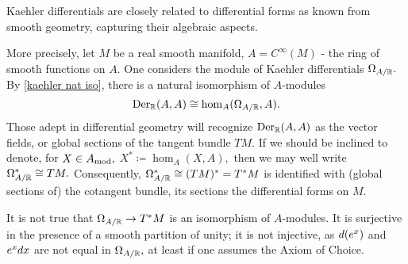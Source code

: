 \begin{note}
  Kaehler differentials are closely related to differential forms as known from smooth geometry, capturing their algebraic aspects.

  More precisely, let \(M\) be a real smooth manifold, \(A = C^\infty(M)\) - the ring of smooth functions on \(A.\) One considers the module of Kaehler differentials \(\Omega_{A/{\mathbb R}}.\) By \cref{kaehler nat iso}, there is a natural isomorphism of \(A\)-modules
  \[\operatorname{Der}_\mathbb R(A, A) \cong \hom_A(\Omega_{A/{\mathbb R}}, A).\]
  Those adept in differential geometry will recognize \(\operatorname{Der}_\mathbb R(A, A)\) as the vector fields, or global sections of the tangent bundle \(TM.\) If we should be inclined to denote, for \(X \in {A}_\mathrm{mod},\) \(X^* \coloneqq \hom_A(X, A),\) then we may well write \(\Omega_{A/{\mathbb R}}^{*} \cong TM.\)
  Consequently, \(\Omega_{A/{\mathbb R}}^* \cong (TM)^* = T^*M\) is identified with (global sections of) the cotangent bundle, its sections the differential forms on \(M.\)

  It is not true that \(\Omega_{A/{\mathbb R}} \to T^*M\) is an isomorphism of \(A\)-modules. It is surjective in the presence of a smooth partition of unity; it is not injective, as \(d(e^x)\) and \(e^x d x\) are not equal in \(\Omega_{A/{\mathbb R}},\) at least if one assumes the Axiom of Choice. \cite{MO}
\end{note}












